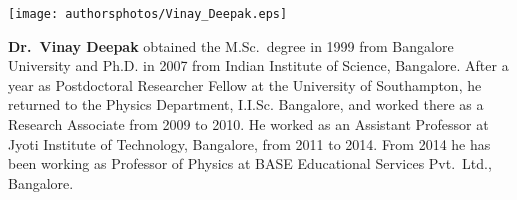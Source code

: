 \centerline{\texttt{[image: authorsphotos/Vinay\_Deepak.eps]}}

\bigskip

\noindent
\textbf{Dr.\ Vinay Deepak} obtained the M.Sc.\ degree in 1999 from Bangalore University and Ph.D. in 2007 from Indian Institute of Science, Bangalore. After a year as Postdoctoral Researcher Fellow at the University of Southampton, he returned to the Physics Department, I.I.Sc. Bangalore, and worked there as a Research Associate from 2009 to 2010. He worked as an Assistant Professor at Jyoti Institute of Technology, Bangalore, from 2011 to 2014. From 2014 he has been working as Professor of Physics at BASE Educational Services Pvt.\ Ltd., Bangalore.

